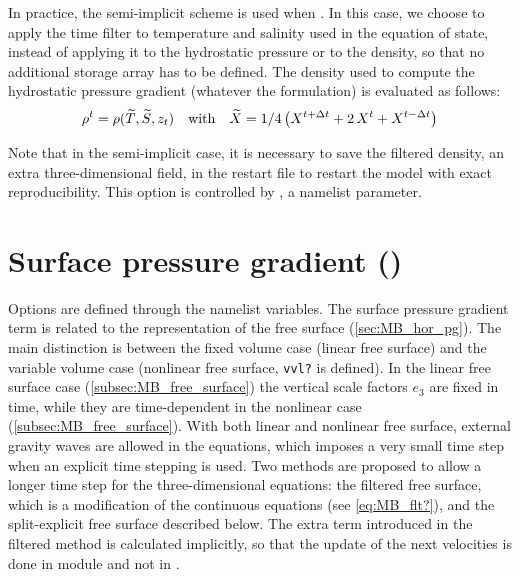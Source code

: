 \documentclass[../main/NEMO_manual]{subfiles}
\begin{document}
In practice, the semi-implicit scheme is used when .
In this case, we choose to apply the time filter to temperature and salinity used in the equation of state,
instead of applying it to the hydrostatic pressure or to the density,
so that no additional storage array has to be defined.
The density used to compute the hydrostatic pressure gradient (whatever the formulation) is evaluated as follows:
\[
  \rho^t = \rho( \widetilde{T},\widetilde {S},z_t)
  \quad	  \text{with}	\quad
  \widetilde{X} = 1 / 4 \left(  X^{t+\Delta t} +2 \,X^t + X^{t-\Delta t}  \right)
\]

Note that in the semi-implicit case, it is necessary to save the filtered density,
an extra three-dimensional field, in the restart file to restart the model with exact reproducibility.
This option is controlled by  , a namelist parameter.

\section[Surface pressure gradient (\textit{dynspg.F90})]{Surface pressure gradient (\protect{})}
\label{sec:DYN_spg}

\begin{listing}
  \caption{}
  \label{lst:namdyn_spg}
\end{listing}

Options are defined through the  namelist variables.
The surface pressure gradient term is related to the representation of the free surface (\autoref{sec:MB_hor_pg}).
The main distinction is between the fixed volume case (linear free surface) and
the variable volume case (nonlinear free surface, \texttt{vvl?} is defined).
In the linear free surface case (\autoref{subsec:MB_free_surface})
the vertical scale factors $e_{3}$ are fixed in time,
while they are time-dependent in the nonlinear case (\autoref{subsec:MB_free_surface}).
With both linear and nonlinear free surface, external gravity waves are allowed in the equations,
which imposes a very small time step when an explicit time stepping is used.
Two methods are proposed to allow a longer time step for the three-dimensional equations:
the filtered free surface, which is a modification of the continuous equations (see \autoref{eq:MB_flt?}),
and the split-explicit free surface described below.
The extra term introduced in the filtered method is calculated implicitly,
so that the update of the next velocities is done in module  and not in .
\end{document}

